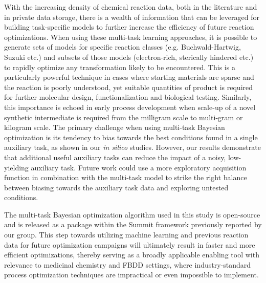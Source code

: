 With the increasing density of chemical reaction data, both in the literature and in private data storage, there is a wealth of information that can be leveraged for building task-specific models to further increase the efficiency of future reaction optimizations. When using these multi-task learning approaches, it is possible to generate sets of models for specific reaction classes (e.g. Buchwald-Hartwig, Suzuki etc.) and subsets of those models (electron-rich, sterically hindered etc.) to rapidly optimize any transformation likely to be encountered. This is a particularly powerful technique in cases where starting materials are sparse and the reaction is poorly understood, yet suitable quantities of product is required for further molecular design, functionalization and biological testing. Similarly, this importance is echoed in early process development when scale-up of a novel synthetic intermediate is required from the milligram scale to multi-gram or kilogram scale. The primary challenge when using multi-task Bayesian optimization is its tendency to bias towards the best conditions found in a single auxiliary task, as shown in our \textit{in silico} studies. However, our results demonstrate that additional useful auxiliary tasks can reduce the impact of a noisy, low-yielding auxiliary task. Future work could use a more exploratory acquisition function in combination with the multi-task model to strike the right balance between biasing towards the auxiliary task data and exploring untested conditions.

The multi-task Bayesian optimization algorithm used in this study is open-source and is released as a package within the Summit framework previously reported by our group. This step towards utilizing machine learning and previous reaction data for future optimization campaigns will ultimately result in faster and more efficient optimizations, thereby serving as a broadly applicable enabling tool with relevance to medicinal chemistry and FBDD settings, where industry-standard process optimization techniques are impractical or even impossible to implement.



